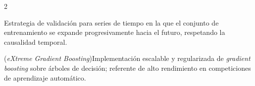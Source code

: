 \documentclass[12pt,letterpaper]{report}
\begin{document}
\begin{multicols}{2}
\begin{description}[leftmargin=0pt, labelindent=0pt, itemindent=0pt,
                    labelsep=0.4em, font=\bfseries\scriptsize,
                    itemsep=1pt, parsep=0pt, topsep=0pt]
    \item[Walk-forward Validation] Estrategia de validación para series de tiempo en la que el conjunto de entrenamiento se expande progresivamente hacia el futuro, respetando la causalidad temporal.

    \item[XGBoost] (\textit{eXtreme Gradient Boosting})\hspace{0.3em}Implementación escalable y regularizada de \textit{gradient boosting} sobre árboles de decisión; referente de alto rendimiento en competiciones de aprendizaje automático.
\end{description}
\end{multicols}

\end{document}

